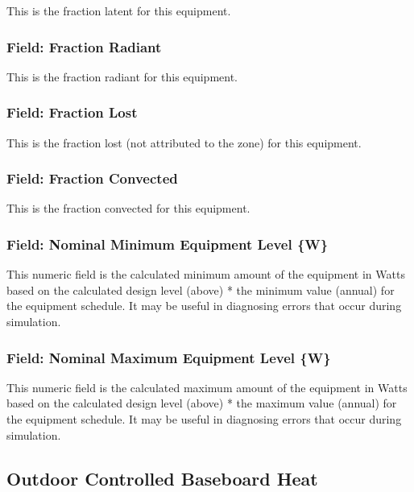 This is the fraction latent for this equipment.

\subsubsection{Field: Fraction Radiant}\label{field-fraction-radiant-3}

This is the fraction radiant for this equipment.

\subsubsection{Field: Fraction Lost}\label{field-fraction-lost-1}

This is the fraction lost (not attributed to the zone) for this equipment.

\subsubsection{Field: Fraction Convected}\label{field-fraction-convected-3}

This is the fraction convected for this equipment.

\subsubsection{Field: Nominal Minimum Equipment Level \{W\}}\label{field-nominal-minimum-equipment-level-w-1}

This numeric field is the calculated minimum amount of the equipment in Watts based on the calculated design level (above) * the minimum value (annual) for the equipment schedule. It may be useful in diagnosing errors that occur during simulation.

\subsubsection{Field: Nominal Maximum Equipment Level \{W\}}\label{field-nominal-maximum-equipment-level-w-1}

This numeric field is the calculated maximum amount of the equipment in Watts based on the calculated design level (above) * the maximum value (annual) for the equipment schedule. It may be useful in diagnosing errors that occur during simulation.

\subsection{Outdoor Controlled Baseboard Heat}\label{outdoor-controlled-baseboard-heat}


